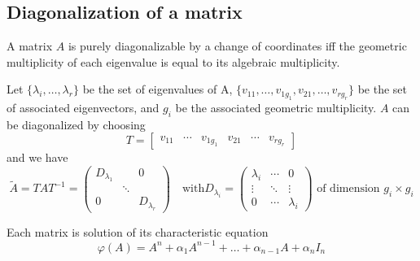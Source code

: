 \documentclass[english]{lectures}
\begin{document}
\subsection{Diagonalization of a matrix}
\begin{theorem}

A matrix $A$ is purely diagonalizable by a change of coordinates iff the geometric multiplicity of each eigenvalue is equal to its algebraic multiplicity.

Let $\{\lambda_i,\dots,\lambda_r\}$ be the set of eigenvalues of A, $\{v_{11},\dots,v_{1g_1},{v_{21}},\dots,v_{rg_r}\}$ be the set of associated eigenvectors, and $g_i$ be the associated geometric multiplicity. $A$ can be diagonalized by choosing 
\[
T=\begin{bmatrix}
    v_{11} & \cdots & v_{1g_1} & v_{21} & \cdots & v_{rg_r}
\end{bmatrix}
\]
and we have
\[
\tilde{A}=TAT^{-1}=\begin{pmatrix}
    D_{\lambda_1} & & 0\\
    & \ddots & \\
    0 & & D_{\lambda_r}
\end{pmatrix} \quad \text{with} D_{\lambda_i} = \begin{pmatrix}
    \lambda_i & \cdots & 0\\
    \vdots & \ddots & \vdots\\
    0 & \cdots & \lambda_i
\end{pmatrix} \text{ of dimension } g_i \times g_i
\]
\end{theorem}


\begin{theorem}
Each matrix is solution of its characteristic equation
\[
\varphi(A)=A^n+\alpha_1 A^{n-1}+ \dots + \alpha_{n-1} A + \alpha_nI_n
\]
\end{theorem}
\end{document}
